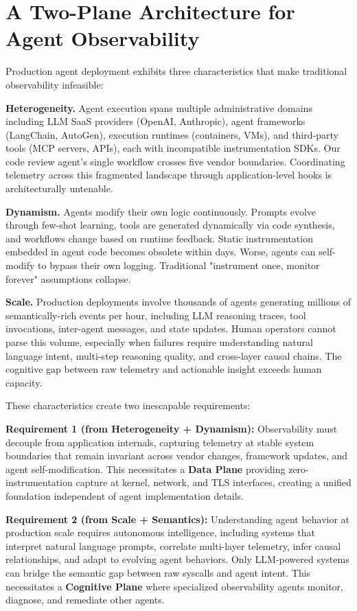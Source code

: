 \documentclass[sigplan,screen,9pt]{acmart}
\begin{document}
\section{A Two-Plane Architecture for Agent Observability}

Production agent deployment exhibits three characteristics that make traditional observability infeasible:

\textbf{Heterogeneity.} Agent execution spans multiple administrative domains including LLM SaaS providers (OpenAI, Anthropic), agent frameworks (LangChain, AutoGen), execution runtimes (containers, VMs), and third-party tools (MCP servers, APIs), each with incompatible instrumentation SDKs. Our code review agent's single workflow crosses five vendor boundaries. Coordinating telemetry across this fragmented landscape through application-level hooks is architecturally untenable.

\textbf{Dynamism.} Agents modify their own logic continuously. Prompts evolve through few-shot learning, tools are generated dynamically via code synthesis, and workflows change based on runtime feedback. Static instrumentation embedded in agent code becomes obsolete within days. Worse, agents can self-modify to bypass their own logging. Traditional "instrument once, monitor forever" assumptions collapse.

\textbf{Scale.} Production deployments involve thousands of agents generating millions of semantically-rich events per hour, including LLM reasoning traces, tool invocations, inter-agent messages, and state updates. Human operators cannot parse this volume, especially when failures require understanding natural language intent, multi-step reasoning quality, and cross-layer causal chains. The cognitive gap between raw telemetry and actionable insight exceeds human capacity.

These characteristics create two inescapable requirements:

\textbf{Requirement 1 (from Heterogeneity + Dynamism):} Observability must decouple from application internals, capturing telemetry at stable system boundaries that remain invariant across vendor changes, framework updates, and agent self-modification. This necessitates a \textbf{Data Plane} providing zero-instrumentation capture at kernel, network, and TLS interfaces, creating a unified foundation independent of agent implementation details.

\textbf{Requirement 2 (from Scale + Semantics):} Understanding agent behavior at production scale requires autonomous intelligence, including systems that interpret natural language prompts, correlate multi-layer telemetry, infer causal relationships, and adapt to evolving agent behaviors. Only LLM-powered systems can bridge the semantic gap between raw syscalls and agent intent. This necessitates a \textbf{Cognitive Plane} where specialized observability agents monitor, diagnose, and remediate other agents.
\end{document}
